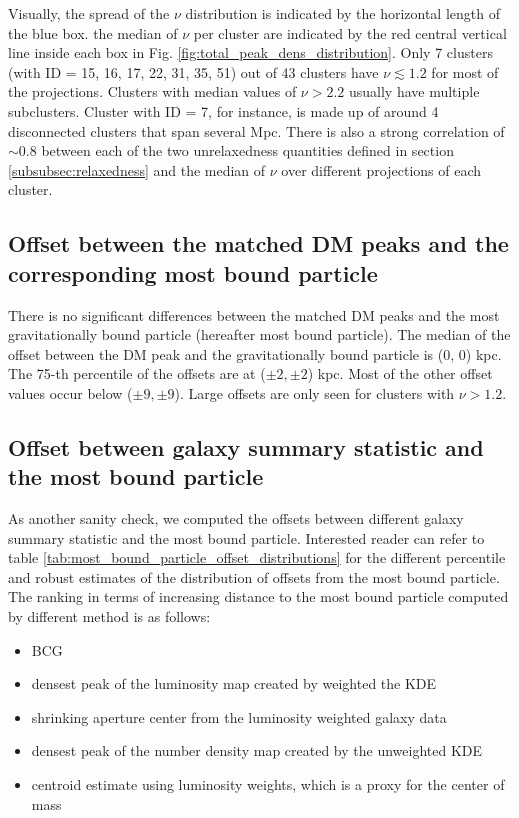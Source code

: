 Visually, the spread of the $\nu$ distribution is indicated by the horizontal 
length of the blue box. 
the median of $\nu$ per cluster are indicated by the red central vertical line
inside each box in Fig. 
\ref{fig:total_peak_dens_distribution}.
Only 7 clusters (with ID = 15, 16, 17, 22, 31, 35, 51) out of 43 clusters have $\nu
\lesssim 1.2$ for most of the projections.
Clusters with median values of $\nu > 2.2$ usually have multiple subclusters.
Cluster with ID = 7, for instance, is made up of around 4 disconnected clusters that span
several Mpc.  
There is also a strong correlation of $\sim 0.8$ 
between each of the two unrelaxedness quantities defined in section 
\ref{subsubsec:relaxedness}
and the median of $\nu$ over different projections of each cluster. 


\subsection{Offset between the matched DM peaks and the corresponding most
bound particle}
There is no significant differences between the matched DM peaks and 
the most gravitationally 
bound particle (hereafter most bound particle).
The median of the offset between the DM peak and the gravitationally bound
particle is (0, 0) kpc. The 75-th percentile of the offsets are at ($\pm2,\pm2$) kpc. 
Most of the other offset values occur below ($\pm 9, \pm 9$). Large offsets
are only seen for clusters with $\nu > 1.2$. 


\subsection{Offset between galaxy summary statistic and the most bound particle}
As another sanity check, we computed the offsets between different galaxy summary
statistic and the most bound particle. 
Interested reader can refer to table
\ref{tab:most_bound_particle_offset_distributions} for the different
percentile and robust estimates of the distribution of offsets from the most bound 
particle. 
The ranking in terms of increasing distance 
to the most bound particle computed by different method is as follows:
\begin{itemize}
	\item BCG 
	\item densest peak of the luminosity map created by weighted the KDE 
		\item shrinking aperture center from the luminosity weighted galaxy data
		\item densest peak of the number density map created by the unweighted KDE 
		\item centroid estimate using luminosity weights, which is a proxy for the
			center of mass
\end{itemize}

